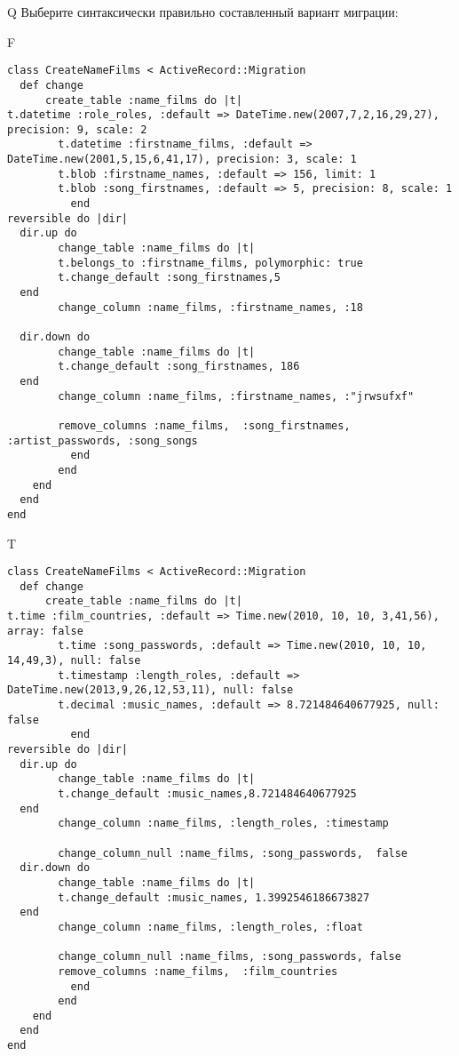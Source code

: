 Q
Выберите синтаксически правильно составленный вариант миграции:

F
\begin{verbatim}
class CreateNameFilms < ActiveRecord::Migration
  def change
	  create_table :name_films do |t|
t.datetime :role_roles, :default => DateTime.new(2007,7,2,16,29,27), precision: 9, scale: 2
		t.datetime :firstname_films, :default => DateTime.new(2001,5,15,6,41,17), precision: 3, scale: 1
		t.blob :firstname_names, :default => 156, limit: 1
		t.blob :song_firstnames, :default => 5, precision: 8, scale: 1
		  end
reversible do |dir|
  dir.up do
		change_table :name_films do |t|
		t.belongs_to :firstname_films, polymorphic: true
 		t.change_default :song_firstnames,5
  end
 		change_column :name_films, :firstname_names, :18
   
  dir.down do
		change_table :name_films do |t|
		t.change_default :song_firstnames, 186
  end
 		change_column :name_films, :firstname_names, :"jrwsufxf"
   
		remove_columns :name_films,  :song_firstnames, :artist_passwords, :song_songs 
	      end
	    end
    end 
  end
end

\end{verbatim}

T
\begin{verbatim}
class CreateNameFilms < ActiveRecord::Migration
  def change
	  create_table :name_films do |t|
t.time :film_countries, :default => Time.new(2010, 10, 10, 3,41,56), array: false
		t.time :song_passwords, :default => Time.new(2010, 10, 10, 14,49,3), null: false
		t.timestamp :length_roles, :default => DateTime.new(2013,9,26,12,53,11), null: false
		t.decimal :music_names, :default => 8.721484640677925, null: false
		  end
reversible do |dir|
  dir.up do
		change_table :name_films do |t|
		t.change_default :music_names,8.721484640677925
  end
 		change_column :name_films, :length_roles, :timestamp
   
		change_column_null :name_films, :song_passwords,  false
  dir.down do
		change_table :name_films do |t|
		t.change_default :music_names, 1.3992546186673827
  end
 		change_column :name_films, :length_roles, :float
   
		change_column_null :name_films, :song_passwords, false
 		remove_columns :name_films,  :film_countries 
	      end
	    end
    end 
  end
end

\end{verbatim}

